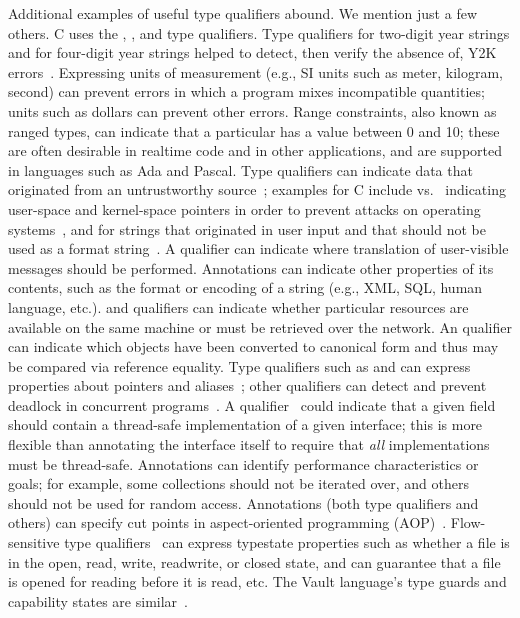 \documentclass[10pt]{article}
\begin{document}
Additional examples of useful type qualifiers abound.  We mention just a
few others.
C uses the , , and  type qualifiers.
%
Type qualifiers  for two-digit year strings and  for
four-digit year strings helped to detect, then verify the absence of, Y2K
errors~\cite{ElsmanFA99}.
%
Expressing units of measurement (e.g., SI units such as meter, kilogram,
second) can prevent errors in which a program mixes incompatible
quantities; units such as dollars can prevent other errors.
%
Range constraints, also known as ranged types, can indicate that a
particular  has a value between 0 and 10; these are often
desirable in realtime code and in other applications, and are supported in
languages such as Ada and Pascal.
%
Type qualifiers can indicate data that originated from an untrustworthy
source~\cite{PalsbergO95,VolpanoS97}; examples for C include  vs.\  indicating user-space and
kernel-space pointers in order to prevent attacks on operating systems~\cite{JohnsonW2004}, and
 for strings that originated in user input and that should
not be used as a format string~\cite{ShankarTFW2001}.
%
A  qualifier can indicate where translation of
user-visible messages should be performed.  Annotations can
indicate other
properties of its contents, such as the format or encoding of a string
(e.g., XML, SQL, human language, etc.).
%
 and  qualifiers can indicate whether particular
resources are available on the same machine or must be retrieved over the
network.
%
An  qualifier can indicate which objects have been converted
to canonical form and thus may be compared via reference equality.
Type qualifiers such as 
and  can express properties about pointers and
aliases~\cite{Evans96,ChinMM2005}; other qualifiers can detect and prevent
deadlock in concurrent programs~\cite{foster:pldi02,aiken:pldi03}.
A  qualifier~\cite{Goetz2006} could indicate that a given
field should contain a thread-safe implementation of a given interface;
this is more flexible than annotating the interface itself to require that
\emph{all} implementations must be thread-safe.
%
Annotations can identify performance characteristics or goals; for
example, some collections should not be iterated over, and others should
not be used for random access.
%
Annotations (both type qualifiers and others) can specify cut points in
aspect-oriented programming (AOP\@)~\cite{EichbergM2004}.
Flow-sensitive type qualifiers~\cite{foster:pldi02} can express typestate
properties such as whether a file is in the open, read, write, readwrite,
or closed state, and can guarantee that a file is opened for reading before
it is read, etc.  The Vault language's type guards and capability states are
similar~\cite{DelineF2001}.
\end{document}
